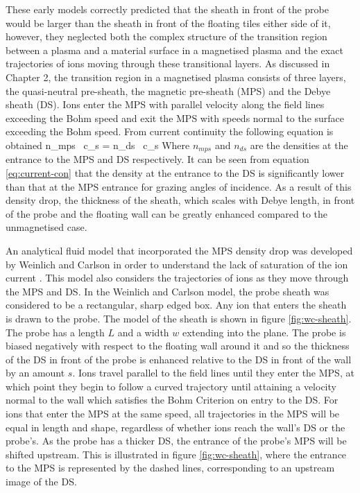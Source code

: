 These early models correctly predicted that the sheath in front of the probe would be larger than the sheath in front of the floating tiles either side of it, however, they neglected both the complex structure of the transition region between a plasma and a material surface in a magnetised plasma and the exact trajectories of ions moving through these transitional layers.  As discussed in Chapter 2, the transition region in a magnetised plasma consists of three layers, the quasi-neutral pre-sheath, the magnetic pre-sheath (MPS) and the Debye sheath (DS). Ions enter the MPS with parallel velocity along the field lines exceeding the Bohm speed and exit the MPS with speeds normal to the surface exceeding the Bohm speed. From current continuity the following equation is obtained \cite{current-con}
\be 
n_{mps} \ c_s \sin{\theta} = n_{ds} \ c_s 
\label{eq:current-con}
\ee 
Where $n_{mps}$ and $n_{ds}$ are the densities at the entrance to the MPS and DS respectively. It can be seen from equation \ref{eq:current-con} that the density at 
the entrance to the DS is significantly lower than that at the MPS entrance for grazing angles of incidence. As a result of this density drop, the thickness of the sheath, which scales with Debye length, in front of the probe and the floating wall can be greatly enhanced compared to the unmagnetised case.
 

An analytical fluid model that incorporated the MPS density drop was developed by Weinlich and Carlson in order to understand the lack of saturation of the ion current \cite{asdex_FMP}. This model also considers the trajectories of ions as they move through the MPS and DS. In the Weinlich and Carlson model, the probe sheath was considered to be a rectangular, sharp edged box. Any ion that enters the sheath is drawn to the probe. The model of the sheath is shown in figure \ref{fig:wc-sheath}. The probe has a length $L$ and a width $w$ extending into the plane. The probe is biased negatively with respect to the floating wall around it and so the thickness of the DS in front of the probe is enhanced relative to the DS in front of the wall by an amount $s$. Ions travel parallel to the field lines until they enter the MPS, at which point they begin to follow a curved trajectory until attaining a velocity normal to the wall which satisfies the Bohm Criterion on entry to the DS. For ions that enter the MPS at the same speed, all trajectories in the MPS will be equal in length and shape, regardless of whether ions reach the wall's DS or the probe's. As the probe has a thicker DS, the entrance of the probe's MPS will be shifted upstream. This is illustrated in figure \ref{fig:wc-sheath}, where the entrance to the MPS is represented by the dashed lines, corresponding to an upstream image of the DS. 

